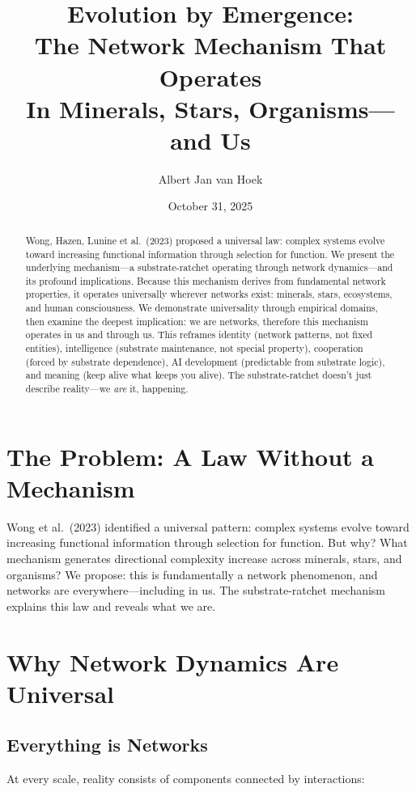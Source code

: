 \documentclass[12pt,a4paper]{article}
\title{\textbf{Evolution by Emergence:}\\[0.5em]
The Network Mechanism That Operates\\
In Minerals, Stars, Organisms---and Us}
\author{Albert Jan van Hoek}
\date{October 31, 2025}
\begin{document}
\maketitle

\begin{abstract}
Wong, Hazen, Lunine et al.\ (2023) proposed a universal law: complex systems evolve toward increasing functional information through selection for function. We present the underlying mechanism---a substrate-ratchet operating through network dynamics---and its profound implications. Because this mechanism derives from fundamental network properties, it operates universally wherever networks exist: minerals, stars, ecosystems, and human consciousness. We demonstrate universality through empirical domains, then examine the deepest implication: we are networks, therefore this mechanism operates in us and through us. This reframes identity (network patterns, not fixed entities), intelligence (substrate maintenance, not special property), cooperation (forced by substrate dependence), AI development (predictable from substrate logic), and meaning (keep alive what keeps you alive). The substrate-ratchet doesn't just describe reality---we \emph{are} it, happening.
\end{abstract}

\section{The Problem: A Law Without a Mechanism}

Wong et al.\ (2023) identified a universal pattern: complex systems evolve toward increasing functional information through selection for function. But why? What mechanism generates directional complexity increase across minerals, stars, and organisms? We propose: this is fundamentally a network phenomenon, and networks are everywhere---including in us. The substrate-ratchet mechanism explains this law and reveals what we are.

\section{Why Network Dynamics Are Universal}

\subsection{Everything is Networks}

At every scale, reality consists of components connected by interactions:
\end{document}
